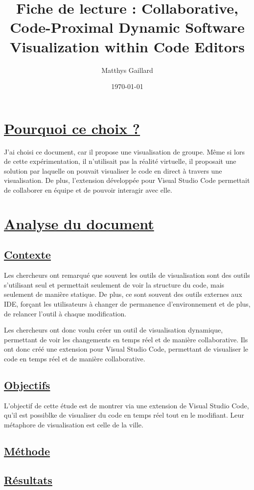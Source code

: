 \documentclass[a4paper,10pt, oneside]{article}
\title{Fiche de lecture : Collaborative, Code-Proximal Dynamic Software Visualization within Code Editors}
\author{Matthys Gaillard}
\date{\today}
\newcommand{\li}{\newline}
\begin{document}
\maketitle
\section{\ul{Pourquoi ce choix ?}}  
    \par J'ai choisi ce document\cite{A32}, car il propose une visualisation de groupe. Même si lors de cette expérimentation, il n'utilisait pas la réalité virtuelle,
    il proposait une solution par laquelle on pouvait visualiser le code en direct à travers une visualisation. De plus, l'extension développée pour Visual Studio Code
    permettait de collaborer en équipe et de pouvoir interagir avec elle.
\section{\ul{Analyse du document}}
\subsection{\ul{Contexte}}
    \par Les chercheurs ont remarqué que souvent les outils de visualisation sont des outils s'utilisant seul et permettait seulement de voir la structure du code, mais seulement
    de manière statique. De plus, ce sont souvent des outils externes aux IDE, forçant les utilisateurs à changer de permanence d'environnement et de plus, de relancer l'outil à chaque modification.\li
    \par Les chercheurs ont donc voulu créer un outil de visualisation dynamique, permettant de voir les changements en temps réel et de manière collaborative. Ils ont donc créé une extension pour Visual Studio Code, permettant de visualiser le code en temps réel et de manière collaborative.
\subsection{\ul{Objectifs}}
    \par L'objectif de cette étude est de montrer via une extension de Visual Studio Code, qu'il est possiblke de visualiser du code en temps réel tout en le modifiant.
    Leur métaphore de visualisation est celle de la ville. 
               
\subsection{\ul{Méthode}}
\subsection{\ul{Résultats}}
\newpage


\end{document}
